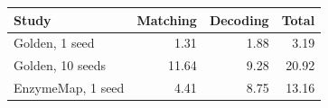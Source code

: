 \begin{tabular}{lrrr}\toprule
Study & Matching & Decoding & Total\\\midrule
Golden, 1 seed & 1.31 & 1.88 & 3.19\\
Golden, 10 seeds & 11.64 & 9.28 & 20.92\\
EnzymeMap, 1 seed & 4.41 & 8.75 & 13.16\\
\bottomrule\end{tabular}
